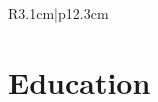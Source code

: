 \documentclass[a4paper,10pt]{article} %
\def \widthone {3.1cm}
\def \widthtwo {12.3cm}
\def \vspac {0.25cm}
\begin{document}
\begin{tabular}{R{\widthone}|p{\widthtwo}}
	
\end{tabular}

\vspace{\vspac}
\section{Education}
\vspace{\vspac}
\noindent
\end{document}
